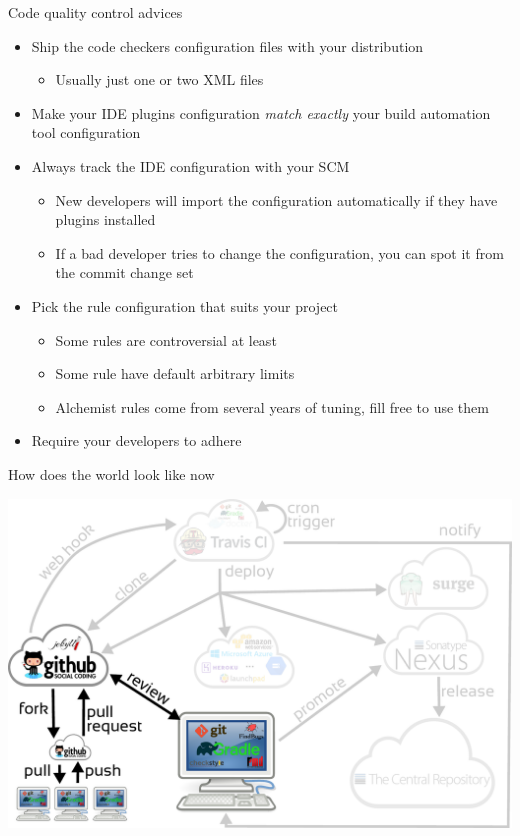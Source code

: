 \documentclass[presentation]{beamer}
\begin{document}
\begin{frame}[fragile]{Code quality control advices}
	\begin{itemize}
		\item Ship the code checkers configuration files with your distribution
		\begin{itemize}
			\item Usually just one or two XML files
		\end{itemize}
		\item Make your IDE plugins configuration \textit{match exactly} your build automation tool configuration
		\item Always track the IDE configuration with your SCM
		\begin{itemize}
			\item New developers will import the configuration automatically if they have plugins installed
			\item If a bad developer tries to change the configuration, you can spot it from the commit change set
		\end{itemize}
		\item Pick the rule configuration that suits your project
		\begin{itemize}
			\item Some rules are controversial at least
			\item Some rule have default arbitrary limits
			\item Alchemist rules come from several years of tuning, fill free to use them
		\end{itemize}
		\item Require your developers to adhere
	\end{itemize}
\end{frame}

\begin{frame}[fragile]{How does the world look like now}
	\begin{center}
		\includegraphics[width=.9\textwidth]{images/ci-codequality}
	\end{center}
\end{frame}
\end{document}
